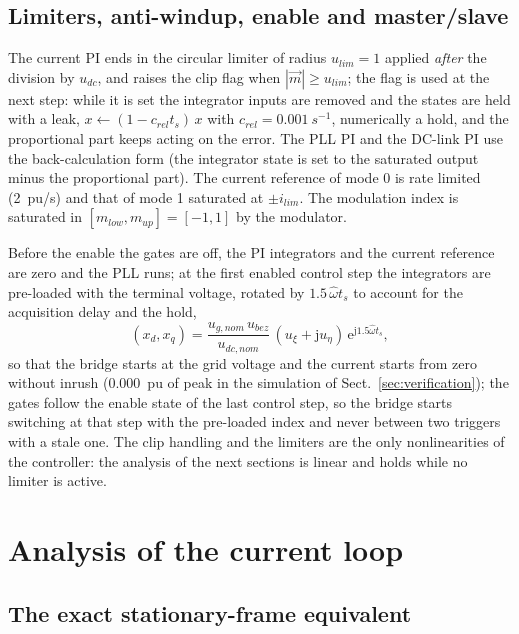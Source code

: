 \documentclass[10pt,a4paper]{scrartcl}
\newcommand{\ts}{t_s}
\newcommand{\jj}{\mathrm{j}}
\newcommand{\ee}{\mathrm{e}}
\begin{document}
\begin{onehalfspace}
\subsection{Limiters, anti-windup, enable and master/slave}
\label{sec:limits}

The current PI ends in the circular limiter of radius $u_{lim} = 1$ applied \emph{after} the division by $u_{dc}$, and raises the clip flag when $|\vec m| \ge u_{lim}$; the flag is used at the next step: while it is set the integrator inputs are removed and the states are held with a leak, $x \leftarrow (1 - c_{rel}\ts)\,x$ with $c_{rel} = \SI{0.001}{s^{-1}}$, numerically a hold, and the proportional part keeps acting on the error. The PLL PI and the DC-link PI use the back-calculation form (the integrator state is set to the saturated output minus the proportional part). The current reference of mode 0 is rate limited (\SI{2}{pu/s}) and that of mode 1 saturated at $\pm i_{lim}$. The modulation index is saturated in $[m_{low}, m_{up}] = [-1, 1]$ by the modulator.

Before the enable the gates are off, the PI integrators and the current reference are zero and the PLL runs; at the first enabled control step the integrators are pre-loaded with the terminal voltage, rotated by $1.5\,\hat\omega\ts$ to account for the acquisition delay and the hold,
\begin{equation}
(x_d, x_q) = \frac{u_{g,nom}\,u_{bez}}{u_{dc,nom}}\,(u_\xi + \jj u_\eta)\,\ee^{\jj 1.5\hat\omega\ts},
\label{eq:bumpless}
\end{equation}
so that the bridge starts at the grid voltage and the current starts from zero without inrush (\SI{0.000}{pu} of peak in the simulation of Sect.~\ref{sec:verification}); the gates follow the enable state of the last control step, so the bridge starts switching at that step with the pre-loaded index and never between two triggers with a stale one. The clip handling and the limiters are the only nonlinearities of the controller: the analysis of the next sections is linear and holds while no limiter is active.

\section{Analysis of the current loop}
\label{sec:analysis}

\subsection{The exact stationary-frame equivalent}
\label{sec:equivalence}


\end{onehalfspace}
\end{document}
